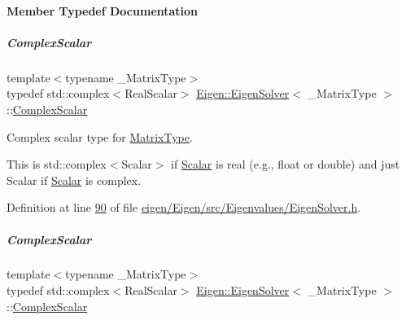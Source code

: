 \paragraph{Member Typedef Documentation}
\mbox{\label{group___eigenvalues___module_a4d0b2a773357d0a6ec98e026f04002ed}} 
\subparagraph{\texorpdfstring{Complex\+Scalar}{ComplexScalar}\hspace{0.1cm}{\footnotesize\ttfamily [1/2]}}
{\footnotesize\ttfamily template$<$typename \+\_\+\+Matrix\+Type$>$ \\
typedef std\+::complex$<$Real\+Scalar$>$ \hyperlink{group___eigenvalues___module_class_eigen_1_1_eigen_solver}{Eigen\+::\+Eigen\+Solver}$<$ \+\_\+\+Matrix\+Type $>$\+::\hyperlink{group___eigenvalues___module_a4d0b2a773357d0a6ec98e026f04002ed}{Complex\+Scalar}}



Complex scalar type for \hyperlink{group___eigenvalues___module_a83acd180404ddaac8a678fa65a6b632b}{Matrix\+Type}. 

This is {\ttfamily std\+::complex$<$\+Scalar$>$} if \hyperlink{group___eigenvalues___module_a017d49fe0d59874b70a2fcf35e5aa373}{Scalar} is real (e.\+g., {\ttfamily float} or {\ttfamily double}) and just {\ttfamily Scalar} if \hyperlink{group___eigenvalues___module_a017d49fe0d59874b70a2fcf35e5aa373}{Scalar} is complex. 

Definition at line \hyperlink{eigen_2_eigen_2src_2_eigenvalues_2_eigen_solver_8h_source_l00090}{90} of file \hyperlink{eigen_2_eigen_2src_2_eigenvalues_2_eigen_solver_8h_source}{eigen/\+Eigen/src/\+Eigenvalues/\+Eigen\+Solver.\+h}.

\mbox{\label{group___eigenvalues___module_a4d0b2a773357d0a6ec98e026f04002ed}} 
\subparagraph{\texorpdfstring{Complex\+Scalar}{ComplexScalar}\hspace{0.1cm}{\footnotesize\ttfamily [2/2]}}
{\footnotesize\ttfamily template$<$typename \+\_\+\+Matrix\+Type$>$ \\
typedef std\+::complex$<$Real\+Scalar$>$ \hyperlink{group___eigenvalues___module_class_eigen_1_1_eigen_solver}{Eigen\+::\+Eigen\+Solver}$<$ \+\_\+\+Matrix\+Type $>$\+::\hyperlink{group___eigenvalues___module_a4d0b2a773357d0a6ec98e026f04002ed}{Complex\+Scalar}}



